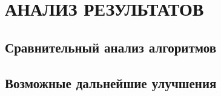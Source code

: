 \section[Анализ результатов]{\MakeTextUppercase{АНАЛИЗ РЕЗУЛЬТАТОВ}}

\subsection{Сравнительный анализ алгоритмов}

\subsection{Возможные дальнейшие улучшения}